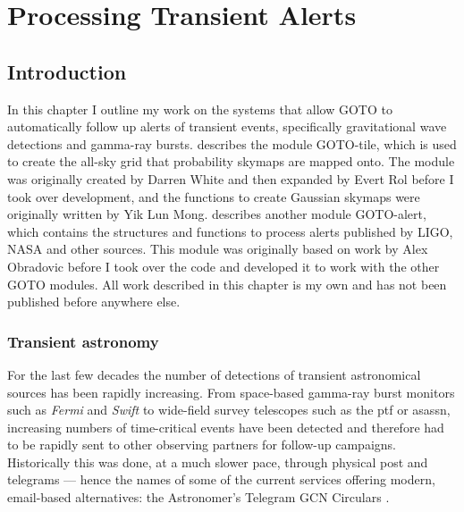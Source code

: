 \chapter{Processing Transient Alerts}
\label{chap:alerts}
\chaptoc{}


\newpage
\section{Introduction}
\label{sec:alerts_intro}
\begin{colsection}


\begin{colsection}


In this chapter I outline my work on the systems that allow GOTO to automatically follow up alerts of transient events, specifically gravitational wave detections and gamma-ray bursts.  describes the  module GOTO-tile, which is used to create the all-sky grid that probability skymaps are mapped onto. The module was originally created by Darren White and then expanded by Evert Rol before I took over development, and the functions to create Gaussian skymaps were originally written by Yik Lun Mong.  describes another  module GOTO-alert, which contains the structures and functions to process alerts published by LIGO, NASA and other sources. This module was originally based on work by Alex Obradovic before I took over the code and developed it to work with the other GOTO modules. All work described in this chapter is my own and has not been published before anywhere else.

\end{colsection}


\subsection{Transient astronomy}
\label{sec:transient_astronomy}
\begin{colsection}

For the last few decades the number of detections of transient astronomical sources has been rapidly increasing. From space-based gamma-ray burst monitors such as \textit{Fermi} and \textit{Swift} to wide-field survey telescopes such as the \gls{ptf} or \gls{asassn}, increasing numbers of time-critical events have been detected and therefore had to be rapidly sent to other observing partners for follow-up campaigns. Historically this was done, at a much slower pace, through physical post and telegrams --- hence the names of some of the current services offering modern, email-based alternatives: the Astronomer's Telegram \citep{ATel} GCN Circulars \citep{GCN}.


\end{colsection}
\end{colsection}
